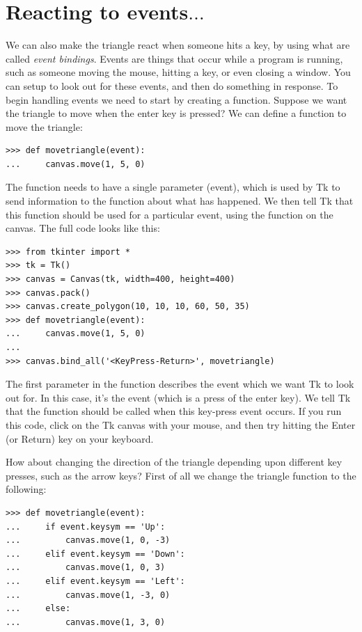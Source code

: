 \section{Reacting to events$\ldots$}

We can also make the triangle react when someone hits a key, by using what are called \emph{event bindings}.  Events are things that occur while a program is running, such as someone moving the mouse, hitting a key, or even closing a window. You can setup  to look out for these events, and then do something in response. To begin handling events we need to start by creating a function. Suppose we want the triangle to move when the enter key is pressed? We can define a function to move the triangle:

\begin{Verbatim}[frame=single]
>>> def movetriangle(event):
...     canvas.move(1, 5, 0)
\end{Verbatim}

The function needs to have a single parameter (event), which is used by Tk to send information to the function about what has happened.  We then tell Tk that this function should be used for a particular event, using the  function on the canvas. The full code looks like this:

\begin{Verbatim}[frame=single]
>>> from tkinter import *
>>> tk = Tk()
>>> canvas = Canvas(tk, width=400, height=400)
>>> canvas.pack()
>>> canvas.create_polygon(10, 10, 10, 60, 50, 35)
>>> def movetriangle(event):
...     canvas.move(1, 5, 0)
...
>>> canvas.bind_all('<KeyPress-Return>', movetriangle)
\end{Verbatim}

The first parameter in the  function describes the event which we want Tk to look out for. In this case, it's the event  (which is a press of the enter key).  We tell Tk that the  function should be called when this key-press event occurs.  If you run this code, click on the Tk canvas with your mouse, and then try hitting the Enter (or Return) key on your keyboard.

How about changing the direction of the triangle depending upon different key presses, such as the arrow keys? First of all we change the  triangle function to the following:

\begin{Verbatim}[frame=single]
>>> def movetriangle(event):
...     if event.keysym == 'Up':
...         canvas.move(1, 0, -3)
...     elif event.keysym == 'Down':
...         canvas.move(1, 0, 3)
...     elif event.keysym == 'Left':
...         canvas.move(1, -3, 0)
...     else:
...         canvas.move(1, 3, 0)
\end{Verbatim}

